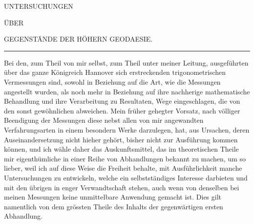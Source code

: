 \renewcommand{\Article}[1]{\par\medskip\Needspace{4\baselineskip}\pdfbookmark[1]{Art. #1}{geodaesie1-art-#1}\centerline{\textbf{#1.}}\nobreak\smallskip}
\begin{center}
UNTERSUCHUNGEN\par\bigskip
ÜBER\par\bigskip
{\large GEGENSTÄNDE DER HÖHERN GEODAESIE.}\par\medskip
\rule{.65in}{.3pt}
\end{center}
\noindent\hspace*{\parindent}Bei den, zum Theil von mir selbst, zum Theil unter meiner Leitung, ausgeführten über das ganze Königreich Hannover sich erstreckenden trigonometrischen Vermessungen sind, sowohl in Beziehung auf die Art, wie die Messungen angestellt wurden, als noch mehr in Beziehung auf ihre nachherige mathematische Behandlung und ihre Verarbeitung zu Resultaten, Wege eingeschlagen, die von den sonst gewöhnlichen abweichen. Mein früher gehegter Vorsatz, nach völliger Beendigung der Messungen diese nebst allen von mir angewandten Verfahrungsarten in einem besondern Werke darzulegen, hat, aus Ursachen, deren Auseinandersetzung nicht hieher gehört, bisher nicht zur Ausführung kommen können, und ich wähle daher das Auskunftsmittel, das im theoretischen Theile mir eigenthümliche in einer Reihe von Abhandlungen bekannt zu machen, um so lieber, weil ich auf diese Weise die Freiheit behalte, mit Ausführlichkeit manche Untersuchungen zu entwickeln, welche ein selbstständiges Interesse darbieten und mit den übrigen in enger Verwandtschaft stehen, auch wenn von denselben bei meinen Messungen keine unmittelbare Anwendung gemacht ist. Dies gilt namentlich von dem grössten Theile des Inhalts der gegenwärtigen ersten Abhandlung.
